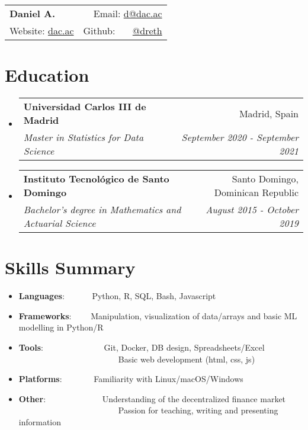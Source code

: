 \documentclass[a4paper,20pt]{article}
\makeatletter
\newcommand{\resumeItem}[2]{
  \item\small{
    \textbf{#1}{: #2 \vspace{-2pt}}
  }
}
\newcommand{\resumeSubheading}[4]{
  \vspace{-1pt}\item
    \begin{tabular*}{0.97\textwidth}{l@{\extracolsep{\fill}}r}
      \textbf{#1} & #2 \\
      \textit{#3} & \textit{#4} \\
    \end{tabular*}\vspace{-5pt}
}
\newcommand{\resumeSubItem}[2]{\resumeItem{#1}{#2}\vspace{-3pt}}
\newcommand{\resumeSubHeadingListStart}{\begin{itemize}[leftmargin=*]}
\newcommand{\resumeSubHeadingListEnd}{\end{itemize}}
\makeatother
\begin{document}
\begin{tabular*}{\textwidth}{l@{\extracolsep{\fill}}r}
  \textbf{{\LARGE Daniel A.}} & Email: {\color{blue}\href{mailto:}{d@dac.ac}}\\
  Website: {\color{blue}\href{https://dac.ac}{dac.ac}} & Github: ~~~{\color{blue}\href{https://github.com/dreth}{@dreth}}
\end{tabular*}




            
\vspace{-4pt}
\section{Education}
\resumeSubHeadingListStart
        
  \resumeSubheading
    {Universidad Carlos III de Madrid}{Madrid, Spain}
    {Master in Statistics for Data Science}{September 2020 - September 2021}
\vspace{-2pt}
  \resumeSubheading
    {Instituto Tecnológico de Santo Domingo}{Santo Domingo, Dominican Republic}
    {Bachelor's degree in Mathematics and Actuarial Science}{August 2015 - October 2019}
\resumeSubHeadingListEnd


            
\vspace{-7pt}
\section{Skills Summary}
  \resumeSubHeadingListStart
            
        
\vspace{-2pt}
\resumeSubItem{Languages}{~~~~~~Python, R, SQL, Bash, Javascript}
\vspace{-2pt}
\resumeSubItem{Frameworks}{~~~~Manipulation, visualization of data/arrays and basic ML modelling in Python/R}
\vspace{-2pt}
\resumeSubItem{Tools}{~~~~~~~~~~~~~~Git, Docker, DB design, Spreadsheets/Excel\\ ~~~~~~~~~~~~~~~~~~~~~~~~Basic web development (html, css, js)}
\vspace{-2pt}
\resumeSubItem{Platforms}{~~~~~~~Familiarity with Linux/macOS/Windows}
\vspace{-2pt}
\resumeSubItem{Other}{~~~~~~~~~~~~~Understanding of the decentralized finance market\\ ~~~~~~~~~~~~~~~~~~~~~~~~Passion for teaching, writing and presenting information}
\resumeSubHeadingListEnd
\end{document}

